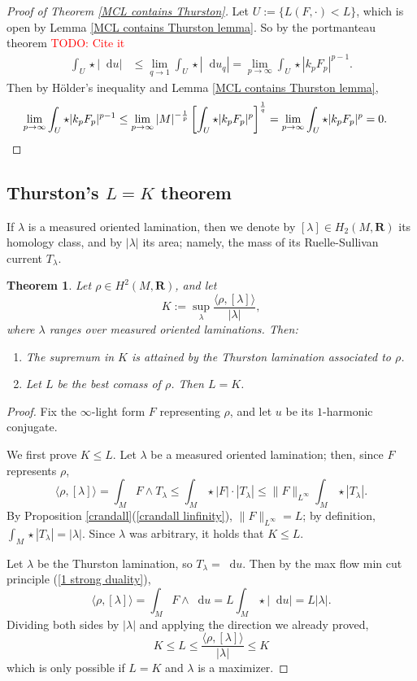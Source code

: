\documentclass[reqno,11pt]{amsart}
\newcommand{\RR}{\mathbf{R}}
\newcommand*\dif{\mathop{}\!\mathrm{d}}
\newtheorem{theorem}{Theorem}[section]
\theoremstyle{definition}
\numberwithin{equation}{section}
\newcommand\todo[1]{\textcolor{red}{TODO: #1}}
\begin{document}
\begin{proof}[Proof of Theorem \ref{MCL contains Thurston}]
Let $U := \{L(F, \cdot) < L\}$, which is open by Lemma \ref{MCL contains Thurston lemma}.
So by the portmanteau theorem \todo{Cite it}
\begin{align*}
\int_U \star |\dif u|
&\leq \lim_{q \to 1} \int_U \star |\dif u_q|
= \lim_{p \to \infty} \int_U \star |k_p F_p|^{p - 1}.
\end{align*}
Then by H\"older's inequality and Lemma \ref{MCL contains Thurston lemma},
\begin{align*}
\lim_{p \to \infty} \int_U \star |k_p F_p|^{p - 1}
&\leq \lim_{p \to \infty} |M|^{-\frac{1}{p}} \left[\int_U \star |k_p F_p|^p\right]^{\frac{1}{q}} 
= \lim_{p \to \infty} \int_U \star |k_p F_p|^p = 0. \qedhere
\end{align*}
\end{proof}



\subsection{Thurston's \texorpdfstring{$L = K$}{L equals K} theorem}
If $\lambda$ is a measured oriented lamination, then we denote by $[\lambda] \in H_2(M, \RR)$ its homology class, and by $|\lambda|$ its area; namely, the mass of its Ruelle-Sullivan current $T_\lambda$.

\begin{theorem}\label{L equals K}
	Let $\rho \in H^2(M, \RR)$, and let 
	$$K := \sup_\lambda \frac{\langle \rho, [\lambda]\rangle}{|\lambda|},$$
	where $\lambda$ ranges over measured oriented laminations. Then:
\begin{enumerate}
	\item The supremum in $K$ is attained by the Thurston lamination associated to $\rho$.
	\item Let $L$ be the best comass of $\rho$. Then $L = K$.
\end{enumerate}
\end{theorem}
\begin{proof}
Fix the $\infty$-light form $F$ representing $\rho$, and let $u$ be its $1$-harmonic conjugate.

We first prove $K \leq L$.
Let $\lambda$ be a measured oriented lamination; then, since $F$ represents $\rho$,
$$\langle \rho, [\lambda]\rangle = \int_M F \wedge T_\lambda \leq \int_M \star |F| \cdot |T_\lambda| \leq \|F\|_{L^\infty} \int_M \star |T_\lambda|.$$
By Proposition \ref{crandall}(\ref{crandall linfinity}), $\|F\|_{L^\infty} = L$; by definition, $\int_M \star |T_\lambda| = |\lambda|$.
Since $\lambda$ was arbitrary, it holds that $K \leq L$.

Let $\lambda$ be the Thurston lamination, so $T_\lambda = \dif u$.
Then by the max flow min cut principle (\ref{1 strong duality}),
$$\langle \rho, [\lambda]\rangle = \int_M F \wedge \dif u = L \int_M \star |\dif u| = L|\lambda|.$$
Dividing both sides by $|\lambda|$ and applying the direction we already proved,
$$K \leq L \leq \frac{\langle \rho, [\lambda]\rangle}{|\lambda|} \leq K$$
which is only possible if $L = K$ and $\lambda$ is a maximizer.
\end{proof}

\printbibliography
\end{document}
